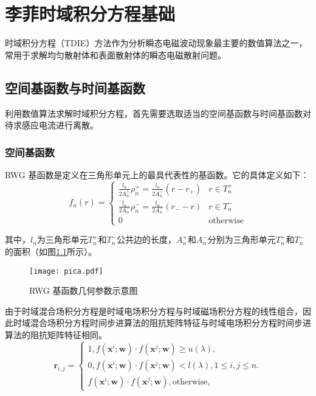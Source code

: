 \documentclass{standalone}
\begin{document}
\chapter{李菲时域积分方程基础}
时域积分方程（TDIE）方法作为分析瞬态电磁波动现象最主要的数值算法之一，常用于求解均匀散射体和表面散射体的瞬态电磁散射问题。

\section{空间基函数与时间基函数}
利用数值算法求解时域积分方程，首先需要选取适当的空间基函数与时间基函数对待求感应电流进行离散。

\subsection{空间基函数}
RWG 基函数是定义在三角形单元上的最具代表性的基函数。它的具体定义如下：
\begin{equation}
f_n(r)=
\begin{cases}
\frac{l_n}{2A_n^+}\rho_n^+=\frac{l_n}{2A_n^+}(r-r_+)&r\in T_n^+\\
\frac{l_n}{2A_n^-}\rho_n^-=\frac{l_n}{2A_n^-}(r_--r)&r\in T_n^-\\
0&\text{otherwise}
\end{cases}
\end{equation}

其中，$l_n$为三角形单元$T_n^+$和$T_n^-$公共边的长度，$A_n^+$和$A_n^-$分别为三角形单元$T_n^+$和$T_n^-$的面积（如图\ref{pica}所示）。

\begin{figure}[h]
	\texttt{[image: pica.pdf]}
	\caption{RWG 基函数几何参数示意图}
	\label{pica}
\end{figure}
由于时域混合场积分方程是时域电场积分方程与时域磁场积分方程的线性组合，因此时域混合场积分方程时间步进算法的阻抗矩阵特征与时域电场积分方程时间步进算法的阻抗矩阵特征相同。
\begin{equation}
\label{latent_binary_variable}
\mathbf{r}_{i,j}=
\begin{cases}
1,f(\mathbf{x}^{i};\mathbf{w})\cdot f(\mathbf{x}^{j};\mathbf{w})\geq u(\lambda),\\
0,f(\mathbf{x}^{i};\mathbf{w})\cdot f(\mathbf{x}^{j};\mathbf{w})< l(\lambda), 1\leq i,j\leq n.\\
f(\mathbf{x}^{i};\mathbf{w})\cdot f(\mathbf{x}^{j};\mathbf{w}),\text{otherwise},
\end{cases}
\end{equation}
\end{document}
